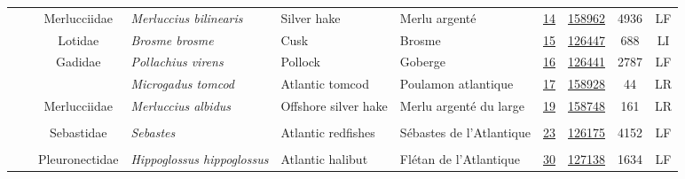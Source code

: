 \documentclass[12pt]{article}\usepackage[]{graphicx}\usepackage[]{color}
\begin{document}
\begin{landscape}
\begin{longtable}[t]{ccc>{\centering\arraybackslash}p{3cm}>{\centering\arraybackslash}p{3cm}>{\centering\arraybackslash}p{3cm}>{}c>{}ccc}
\nopagebreak
\hspace{1em}\hspace{1em} &  & Merlucciidae & \em{Merluccius bilinearis} & Silver hake & Merlu argenté & \href{#sec:14}{14} & \href{http://www.marinespecies.org/aphia.php?p=taxdetails&id=158962}{158962} & 4936 & LF\\
\nopagebreak
\hspace{1em}\hspace{1em} &  & Lotidae & \em{Brosme brosme} & Cusk & Brosme & \href{#sec:15}{15} & \href{http://www.marinespecies.org/aphia.php?p=taxdetails&id=126447}{126447} & 688 & LI\\
\nopagebreak
\hspace{1em}\hspace{1em} &  & Gadidae & \em{Pollachius virens} & Pollock & Goberge & \href{#sec:16}{16} & \href{http://www.marinespecies.org/aphia.php?p=taxdetails&id=126441}{126441} & 2787 & LF\\
\nopagebreak
\hspace{1em}\hspace{1em} &  &  & \em{Microgadus tomcod} & Atlantic tomcod & Poulamon atlantique & \href{#sec:17}{17} & \href{http://www.marinespecies.org/aphia.php?p=taxdetails&id=158928}{158928} & 44 & LR\\
\nopagebreak
\hspace{1em}\hspace{1em} &  & Merlucciidae & \em{Merluccius albidus} & Offshore silver hake & Merlu argenté du large & \href{#sec:19}{19} & \href{http://www.marinespecies.org/aphia.php?p=taxdetails&id=158748}{158748} & 161 & LR\\
\nopagebreak
\addlinespace[0.3em]
\\
\hspace{1em}\hspace{1em} &  & Sebastidae & \em{Sebastes} & Atlantic redfishes & Sébastes de l'Atlantique & \href{#sec:23}{23} & \href{http://www.marinespecies.org/aphia.php?p=taxdetails&id=126175}{126175} & 4152 & LF\\
\nopagebreak
\addlinespace[0.3em]
\\
\hspace{1em}\hspace{1em} &  & Pleuronectidae & \em{Hippoglossus hippoglossus} & Atlantic halibut & Flétan de l'Atlantique & \href{#sec:30}{30} & \href{http://www.marinespecies.org/aphia.php?p=taxdetails&id=127138}{127138} & 1634 & LF\\

\end{longtable}
\end{landscape}
\end{document}
